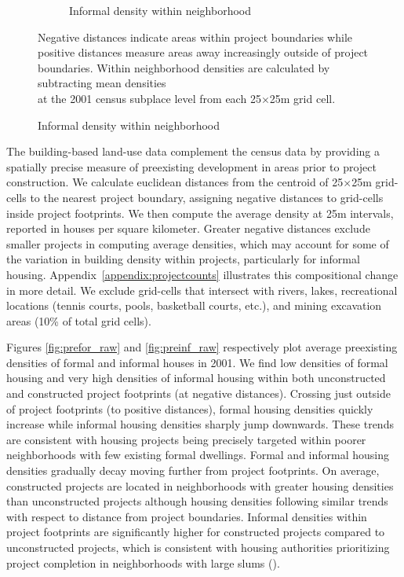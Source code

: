 \documentclass[12pt]{article}
\begin{document}
\begin{figure}[h!]
\begin{subfigure}[b]{0.495\textwidth}
            \caption[]%
            {{\small Informal density within neighborhood}}    
            \label{fig:preinf_fe}
        \end{subfigure}
        \label{fig:rawbblumeans_het}
   {\scriptsize Negative distances indicate areas within project boundaries while positive distances measure areas away increasingly outside of project boundaries.  Within neighborhood densities are calculated by subtracting mean densities  \\[-.5em] at the 2001 census subplace level from each 25$\times$25m grid cell.}
    \end{figure} 


The building-based land-use data complement the census data by providing a spatially precise measure of preexisting development in areas prior to project construction.  We calculate euclidean distances from the centroid of 25$\times$25m grid-cells to the nearest project boundary, assigning negative distances to grid-cells inside project footprints.  We then compute the average density at 25m intervals, reported in houses per square kilometer.  Greater negative distances exclude smaller projects in computing average densities, which may account for some of the variation in building density within projects, particularly for informal housing.  Appendix~\ref{appendix:projectcounts} illustrates this compositional change in more detail.  We exclude grid-cells that intersect with rivers, lakes, recreational locations (tennis courts, pools, basketball courts, etc.), and mining excavation areas (10\% of total grid cells).

Figures \ref{fig:prefor_raw} and \ref{fig:preinf_raw} respectively plot average preexisting densities of formal and informal houses in 2001. We find low densities of formal housing and very high densities of informal housing within both unconstructed and constructed project footprints (at negative distances).  Crossing just outside of project footprints (to positive distances), formal housing densities quickly increase while informal housing densities sharply jump downwards.  These trends are consistent with housing projects being precisely targeted within poorer neighborhoods with few existing formal dwellings.  Formal and informal housing densities gradually decay moving further from project footprints.  On average, constructed projects are located in neighborhoods with greater housing densities than unconstructed projects although housing densities following similar trends with respect to distance from project boundaries.  Informal densities within project footprints are significantly higher for constructed projects compared to unconstructed projects, which is consistent with housing authorities prioritizing project completion in neighborhoods with large slums (\cite{hofmeyr2008risk}).  
\end{document}
